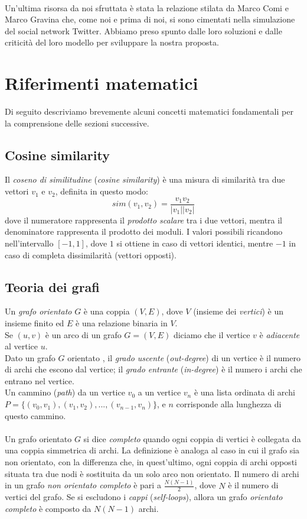 \documentclass[a4paper,12pt]{article}
\begin{document}
\\
Un'ultima risorsa da noi sfruttata è stata la relazione stilata da Marco Comi e Marco Gravina che, come noi e prima di noi, si sono cimentati nella simulazione del social network Twitter. Abbiamo preso spunto dalle loro soluzioni e dalle criticità del loro modello per sviluppare la nostra proposta.
\section{Riferimenti matematici}
Di seguito descriviamo brevemente alcuni concetti matematici fondamentali per la comprensione delle sezioni successive.
\label{sec:mat}
\subsection{Cosine similarity}
\label{subsec:cos}
Il \textit{coseno di similitudine} (\textit{cosine similarity}) \cite{ir} è una misura di similarità tra due vettori $v_1$ e $v_2$, definita in questo modo:
\begin{equation}
sim(v_1,v_2) = \dfrac{v_1v_2}{|v_1||v_2|}
\end{equation}
dove il numeratore rappresenta il \textit{prodotto scalare} tra i due vettori, mentra il denominatore rappresenta il prodotto dei moduli. I valori possibili ricandono nell'intervallo $[-1,1]$, dove $1$ si ottiene in caso di vettori identici, mentre $-1$ in caso di completa dissimilarità (vettori opposti). 
\subsection{Teoria dei grafi}
\label{subsec:graph}
Un \textit{grafo orientato} $G$ \cite{cormen} è una coppia $(V,E)$, dove $V$ (insieme dei \textit{vertici}) è un insieme finito ed $E$ è una relazione binaria in $V$.\\
Se $(u,v)$ è un arco \cite{cormen} di un grafo $G = (V,E)$ diciamo che il vertice $v$ è \textit{adiacente} al vertice $u$.\\
Dato un grafo $G$ orientato \cite{cormen}, il \textit{grado uscente} (\textit{out-degree}) di un vertice è il numero di archi che escono dal vertice; il \textit{grado entrante} (\textit{in-degree}) è il numero i archi che entrano nel vertice. \\
Un cammino (\textit{path}) \cite{barabasi} da un vertice $v_0$ a un vertice $v_n$ è una lista ordinata di archi $P = \{(v_0,v_1),(v_1,v_2),...,(v_{n-1},v_n)\}$, e $n$ corrisponde alla lunghezza di questo cammino. \\
\\
Un grafo orientato $G$ si dice \textit{completo} \cite{barabasi} quando ogni coppia di vertici è collegata da una coppia simmetrica di archi. La definizione è analoga al caso in cui il grafo sia non orientato, con la differenza che, in quest'ultimo, ogni coppia di archi opposti situata tra due nodi è sostituita da un solo arco non orientato. Il numero di archi \cite{barabasi} in un grafo \textit{non orientato completo} è pari a $\tfrac{N(N-1)}{2}$, dove $N$ è il numero di vertici del grafo. Se si escludono i \textit{cappi} (\textit{self-loops}), allora un grafo \textit{orientato completo} è composto da $N(N-1)$ archi. 
\end{document}
